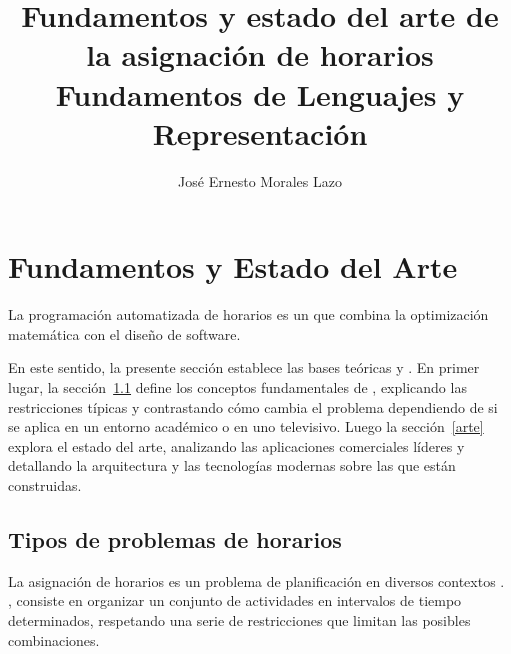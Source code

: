 \documentclass{article}
\title{Fundamentos y estado del arte de la asignación de horarios \\
        \large Fundamentos de Lenguajes y Representación}
\author{José Ernesto Morales Lazo}
\date{}
\begin{document}
\hypersetup{
    colorlinks=true,
    linkcolor=blue,
    citecolor=blue,
    urlcolor=blue
}

\maketitle

\section{Fundamentos y Estado del Arte}
\label{fundamentos}

La programación automatizada de horarios es un  que combina la optimización matemática con el diseño de software.   

En este sentido, la presente sección establece las bases teóricas y . En primer lugar, la sección~\ref{tipos} define los conceptos fundamentales de , explicando las restricciones típicas y contrastando cómo cambia el problema dependiendo de si se aplica en un entorno académico o en uno televisivo. Luego la sección~\ref{arte} explora el estado del arte, analizando las aplicaciones comerciales líderes  y detallando la arquitectura y las tecnologías modernas sobre las que están construidas.

\subsection{Tipos de problemas de horarios}
\label{tipos}

La asignación de horarios es un problema de planificación  en diversos contextos \cite{babaei2015}. , consiste en organizar un conjunto de actividades en intervalos de tiempo determinados, respetando una serie de restricciones que limitan las posibles combinaciones.
\end{document}
